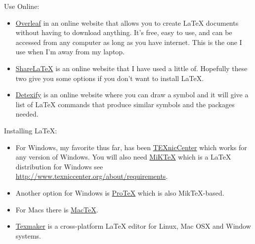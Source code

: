 \documentclass[11pt]{article}
\begin{document}
\begin{enumerate}
{\large{\item Use Online:}}
\begin{itemize}
\item {\color{blue}\href{https://www.overleaf.com/}{Overleaf}} in an online website that allows you to create LaTeX documents without having to download anything. It's free, easy to use, and can be accessed from any computer as long as you have internet. This is the one I use when I'm away from my laptop.


\item {\color{blue}\href{https://www.sharelatex.com/}{ShareLaTeX}} is an online website that I have used a little of. Hopefully these two give you some options if you don't want to install LaTeX.

\item {\color{blue}\href{http://detexify.kirelabs.org/classify.html}{Detexify}} is an online website where you can draw a symbol and it will give a list of LaTeX commands that produce similar symbols and the packages needed.

\end{itemize}

{\large{\item Installing LaTeX:}}

\begin{itemize}
\item For Windows, my favorite thus far, has been {\color{blue}\href{http://www.texniccenter.org/}{TEXnicCenter}} which works for any version of Windows. You will also need {\color{blue}\href{http://www.miktex.org/}{MiKTeX}} which is a LaTeX distribution for Windows see \\
{\color{blue}\href{http://www.texniccenter.org/about/requirements}{http://www.texniccenter.org/about/requirements}}.

\item Another option for Windows is {\color{blue}\href{http://www.tug.org/protext/}{ProTeX}} which is also MikTeX-based.

\item For Macs there is {\color{blue}\href{http://tug.org/mactex/}{MacTeX}}.

\item {\color{blue}\href{http://www.xm1math.net/texmaker/}{Texmaker}} is a cross-platform LaTeX editor for Linux, Mac OSX and Window systems.

\end{itemize}


\end{enumerate}
\end{document}
